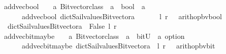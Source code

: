 \begin{isabellebody}
\isanewline
\isanewline
%
\isanewline
%
\isanewline
%
\isanewline
%
\isanewline
\isanewline
{}\isamarkupfalse%
\ add{\isacharunderscore}vec{\isacharunderscore}bool\ \ {\isacharcolon}{\isacharcolon}\ {\isachardoublequoteopen}\ {\isacharprime}a\ Bitvector{\isacharunderscore}class\ {\isasymRightarrow}\ {\isacharprime}a\ {\isasymRightarrow}\ bool\ {\isasymRightarrow}\ {\isacharprime}a\ {\isachardoublequoteclose}\ \ \ \isanewline
\ \ \ \ \ {\isachardoublequoteopen}\ add{\isacharunderscore}vec{\isacharunderscore}bool\ dict{\isacharunderscore}Sail{}{\isacharunderscore}values{\isacharunderscore}Bitvector{\isacharunderscore}a\ \ \ \ \ \ \ l\ r\ {\isacharequal}\ {\isacharparenleft}\ arith{\isacharunderscore}op{\isacharunderscore}bv{\isacharunderscore}bool\ \isanewline
\ \ dict{\isacharunderscore}Sail{}{\isacharunderscore}values{\isacharunderscore}Bitvector{\isacharunderscore}a\ {\isacharparenleft}{\isacharplus}{\isacharparenright}\ False\ l\ r\ {\isacharparenright}{\isachardoublequoteclose}\isanewline
\isanewline
{}\isamarkupfalse%
\ add{\isacharunderscore}vec{\isacharunderscore}bit{\isacharunderscore}maybe\ \ {\isacharcolon}{\isacharcolon}\ {\isachardoublequoteopen}\ {\isacharprime}a\ Bitvector{\isacharunderscore}class\ {\isasymRightarrow}\ {\isacharprime}a\ {\isasymRightarrow}\ bitU\ {\isasymRightarrow}\ {\isacharprime}a\ option\ {\isachardoublequoteclose}\ \ \ \isanewline
\ \ \ \ \ {\isachardoublequoteopen}\ add{\isacharunderscore}vec{\isacharunderscore}bit{\isacharunderscore}maybe\ dict{\isacharunderscore}Sail{}{\isacharunderscore}values{\isacharunderscore}Bitvector{\isacharunderscore}a\ \ l\ r\ {\isacharequal}\ {\isacharparenleft}\ arith{\isacharunderscore}op{\isacharunderscore}bv{\isacharunderscore}bit\ \isanewline

\end{isabellebody}
